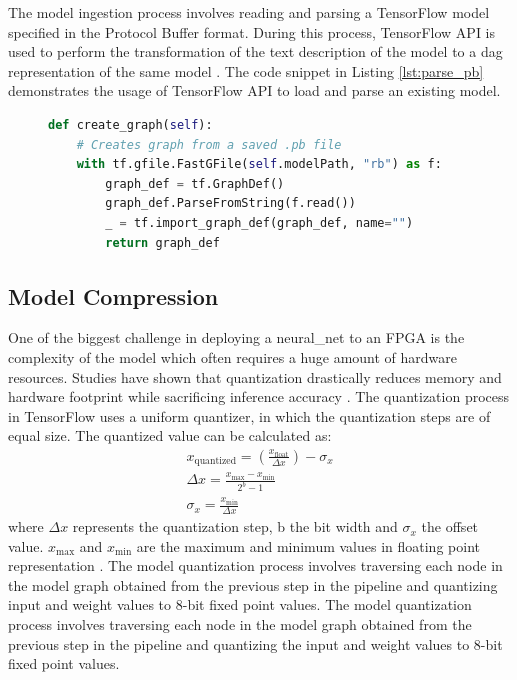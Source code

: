 \documentclass{uw-ece-wkrpt}
\begin{document}
The model ingestion process involves reading and parsing a TensorFlow model specified in the Protocol Buffer format. During this process, TensorFlow API is used to perform the transformation of the text description of the model to a \gls{dag} representation of the same model \cite{Google-Inc.2018TensorFlow-API-}. The code snippet in Listing \ref{lst:parse_pb} demonstrates the usage of TensorFlow API to load and parse an existing model.

\begin{figure}
\centering
\begin{lstlisting}[caption={Sample code that parses a .pb file}, label=lst:parse_pb, language=Python]
def create_graph(self):
    # Creates graph from a saved .pb file
    with tf.gfile.FastGFile(self.modelPath, "rb") as f:
        graph_def = tf.GraphDef()
        graph_def.ParseFromString(f.read())
        _ = tf.import_graph_def(graph_def, name="")
        return graph_def
\end{lstlisting}
\end{figure}

\subsection{Model Compression}

One of the biggest challenge in deploying a \gls{neural_net} to an FPGA is the complexity of the model which often requires a huge amount of hardware resources. Studies have shown that quantization drastically reduces memory and hardware footprint while sacrificing inference accuracy \cite{Sheng2018A-Quantization-}. The quantization process in TensorFlow uses a uniform quantizer, in which the quantization steps are of equal size. The quantized value can be calculated as:
\begin{gather}
    x_\mathrm{quantized} = \left(\frac{x_\mathrm{float}}{\Delta x}\right) - \sigma_x \\
    \Delta x = \frac{x_\mathrm{max} - x_\mathrm{min}}{2^b - 1} \\
    \sigma_x = \frac{x_\mathrm{min}}{\Delta x}
\end{gather}
where $\Delta x$ represents the quantization step, b the bit width and $\sigma_x$ the offset value. $x_\mathrm{max}$ and $x_\mathrm{min}$ are the maximum and minimum values in floating point representation \cite{Sheng2018A-Quantization-}. The model quantization process involves traversing each node in the model graph obtained from the previous step in the pipeline and quantizing input and \gls{weight} values to 8-bit fixed point values. The model quantization process involves traversing each node in the model graph obtained from the previous step in the pipeline and quantizing the input and \gls{weight} values to 8-bit fixed point values.
\end{document}
